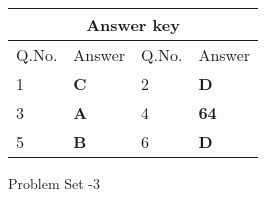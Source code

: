\setlength\arrayrulewidth{1pt}
\begin{table}[H]
	\centering
	\begin{tabular}{|p{1.5cm}|p{1.5cm}||p{1.5cm}|p{1.5cm}|}
		\hline
		\multicolumn{4}{|c|}{\textbf{Answer key}}\\\hline\hline
		\rowcolor{ocrel}Q.No.&Answer&Q.No.&Answer\\\hline
		1&\textbf{C} &2&\textbf{D}\\\hline 
		3&\textbf{A} &4&\textbf{64} \\\hline
		5&\textbf{B} &6&\textbf{D} \\\hline
	
		
	\end{tabular}
\end{table}
\newpage 
\begin{abox}
	Problem Set -3
\end{abox}
